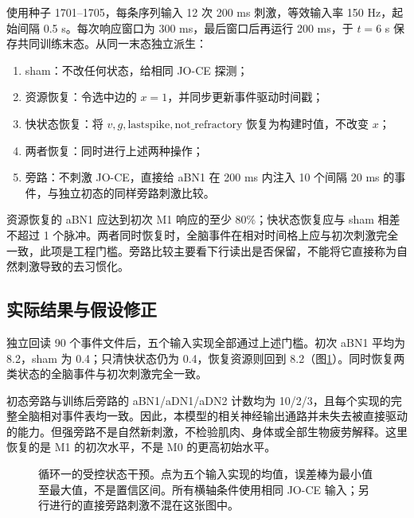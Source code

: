 \documentclass[UTF8,a4paper,zihao=-4,fontset=none]{ctexart}
\begin{document}
使用种子 1701--1705，每条序列输入 12 次 200 ms 刺激，等效输入率 150 Hz，起始间隔 0.5 s。每次响应窗口为 300 ms，最后窗口后再运行 200 ms，于 $t=6$ s 保存共同训练末态。从同一末态独立派生：
\begin{enumerate}
\item sham：不改任何状态，给相同 JO-CE 探测；
\item 资源恢复：令选中边的 $x=1$，并同步更新事件驱动时间戳；
\item 快状态恢复：将 $v,g,\mathrm{lastspike},\mathrm{not\_refractory}$ 恢复为构建时值，不改变 $x$；
\item 两者恢复：同时进行上述两种操作；
\item 旁路：不刺激 JO-CE，直接给 aBN1 在 200 ms 内注入 10 个间隔 20 ms 的事件，与独立初态的同样旁路刺激比较。
\end{enumerate}

资源恢复的 aBN1 应达到初次 M1 响应的至少 80\%；快状态恢复应与 sham 相差不超过 1 个脉冲。两者同时恢复时，全脑事件在相对时间格上应与初次刺激完全一致，此项是工程门槛。旁路比较主要看下行读出是否保留，不能将它直接称为自然刺激导致的去习惯化。

\subsection{实际结果与假设修正}
独立回读 90 个事件文件后，五个输入实现全部通过上述门槛。初次 aBN1 平均为 8.2，sham 为 0.4；只清快状态仍为 0.4，恢复资源则回到 8.2（图\ref{fig:causal}）。同时恢复两类状态的全脑事件与初次刺激完全一致。

初态旁路与训练后旁路的 aBN1/aDN1/aDN2 计数均为 10/2/3，且每个实现的完整全脑相对事件表均一致。因此，本模型的相关神经输出通路并未失去被直接驱动的能力。但强旁路不是自然新刺激，不检验肌肉、身体或全部生物疲劳解释。这里恢复的是 M1 的初次水平，不是 M0 的更高初始水平。

\begin{figure}[!htbp]
\centering
{}
\caption{循环一的受控状态干预。点为五个输入实现的均值，误差棒为最小值至最大值，不是置信区间。所有横轴条件使用相同 JO-CE 输入；另行进行的直接旁路刺激不混在这张图中。}
\label{fig:causal}
\end{figure}
\end{document}

